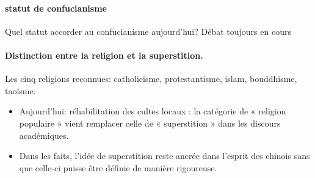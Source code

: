 \paragraph{statut de confucianisme} Quel statut accorder au confucianisme aujourd’hui? Débat toujours en cours
\paragraph{Distinction entre la religion et la superstition.}
Les cinq religions reconnues: catholicisme, protestantisme, islam, bouddhisme, taoïsme.

\begin{itemize}
    \item  	Aujourd’hui: réhabilitation des cultes locaux : la catégorie de
« religion populaire » vient remplacer celle de « superstition » dans les discours académiques.
   \item 	Dans les faits, l’idée de superstition reste ancrée dans l’esprit des chinois sans que celle-ci puisse être définie de manière rigoureuse.
\end{itemize}

